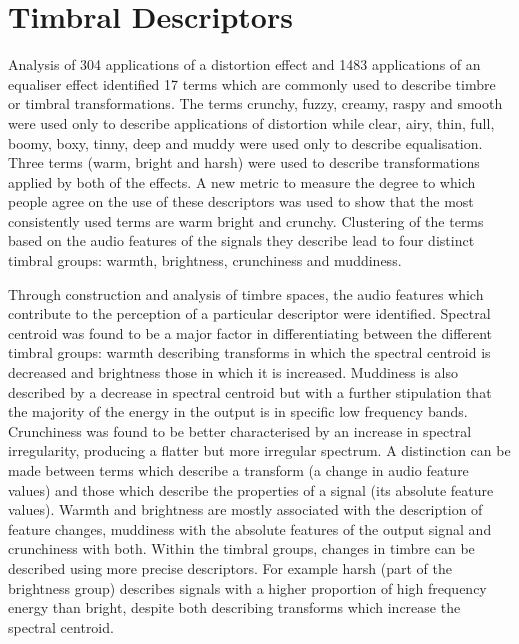 \section{Timbral Descriptors}
\label{sec:Conclusion-Descriptors}
	Analysis of 304 applications of a distortion effect and 1483 applications of an equaliser effect identified 17 terms
	which are commonly used to describe timbre or timbral transformations. The terms crunchy, fuzzy, creamy, raspy and
	smooth were used only to describe applications of distortion while clear, airy, thin, full, boomy, boxy, tinny, deep
	and muddy were used only to describe equalisation. Three terms (warm, bright and harsh) were used to describe
	transformations applied by both of the effects. A new metric to measure the degree to which people agree on the use
	of these descriptors was used to show that the most consistently used terms are warm bright and crunchy. Clustering
	of the terms based on the audio features of the signals they describe lead to four distinct timbral groups:
	warmth, brightness, crunchiness and muddiness. 

	Through construction and analysis of timbre spaces, the audio features which contribute to the perception of a
	particular descriptor were identified. Spectral centroid was found to be a major factor in differentiating between
	the different timbral groups: warmth describing transforms in which the spectral centroid is decreased and
	brightness those in which it is increased. Muddiness is also described by a decrease in spectral centroid but with a
	further stipulation that the majority of the energy in the output is in specific low frequency bands. Crunchiness
	was found to be better characterised by an increase in spectral irregularity, producing a flatter but more irregular
	spectrum. A distinction can be made between terms which describe a transform (a change in audio feature values) and
	those which describe the properties of a signal (its absolute feature values). Warmth and brightness are mostly
	associated with the description of feature changes, muddiness with the absolute features of the output signal and
	crunchiness with both. Within the timbral groups, changes in timbre can be described using more precise descriptors.
	For example harsh (part of the brightness group) describes signals with a higher proportion of high frequency energy
	than bright, despite both describing transforms which increase the spectral centroid.


